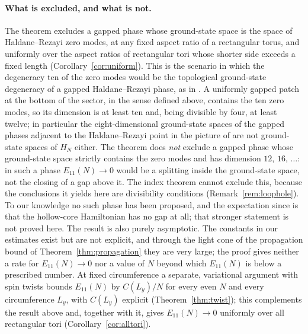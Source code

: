 \paragraph{What is excluded, and what is not.}
The theorem excludes a gapped phase whose ground-state space is the space of Haldane--Rezayi zero modes, at
any fixed aspect ratio of a rectangular torus, and uniformly over the aspect ratios of rectangular tori whose
shorter side exceeds a fixed length (Corollary~\ref{cor:uniform}). This is the scenario in which the degeneracy ten of the zero
modes would be the topological ground-state degeneracy of a gapped Haldane--Rezayi phase, as in
\cite{KVW93,GFN97,Ino99}. A uniformly gapped patch at the bottom of the sector, in the sense defined above,
contains the ten zero modes,
so its dimension is at least ten and, being divisible by four, at least twelve; in particular the eight-dimensional ground-state
spaces of the gapped phases adjacent to the Haldane--Rezayi point in the picture of \cite{RG00} are not
ground-state spaces of $H_N$ either. The theorem does \emph{not} exclude a gapped phase whose ground-state
space strictly contains the zero modes and has dimension $12$, $16$, $\dots$: in such a phase
$E_{11}(N)\to0$ would be a splitting inside the ground-state space, not the closing of a gap above it.
The index theorem cannot exclude this, because the conclusions it yields here are divisibility conditions
(Remark~\ref{rem:loophole}). To our
knowledge no such phase has been proposed, and the expectation since \cite{RG00} is that the hollow-core
Hamiltonian has no gap at all; that stronger statement is not proved here. The result is also purely
asymptotic. The constants in our estimates exist but are not explicit, and through the light cone of the
propagation bound of Theorem~\ref{thm:propagation} they are very large; the proof gives neither a rate for $E_{11}(N)\to0$ nor a value of
$N$ beyond which $E_{11}(N)$ is below a prescribed number. At fixed circumference a separate, variational argument with spin
twists bounds $E_{11}(N)$ by $C(L_y)/N$ for every even $N$ and every circumference $L_y$, with $C(L_y)$ explicit
(Theorem~\ref{thm:twist}); this complements the result above and, together with it, gives $E_{11}(N)\to0$ uniformly over
all rectangular tori (Corollary~\ref{cor:alltori}).

